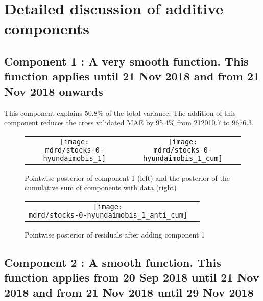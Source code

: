 \documentclass{article} %
\begin{document}
\section{Detailed discussion of additive components}
\label{sec:discussion}

\subsection{Component 1 : A very smooth function. This function applies until 21 Nov 2018 and from 21 Nov 2018 onwards}



This component explains 50.8\% of the total variance.
The addition of this component reduces the cross validated MAE by 95.4\% from 212010.7 to 9676.3.


\begin{figure}[H]
\newcommand{\wmgd}{0.5\columnwidth}
\newcommand{\hmgd}{3.0cm}
\newcommand{\mdrd}{stocks-0-hyundaimobis}
\newcommand{\mbm}{\hspace{-0.3cm}}
\begin{tabular}{cc}
\mbm \texttt{[image: \\mdrd/stocks-0-hyundaimobis\_1]} & \texttt{[image: \\mdrd/stocks-0-hyundaimobis\_1\_cum]}
\end{tabular}
\caption{Pointwise posterior of component 1 (left) and the posterior of the cumulative sum of components with data (right)}
\label{fig:comp1}
\end{figure}

\begin{figure}[H]
\newcommand{\wmgd}{0.5\columnwidth}
\newcommand{\hmgd}{3.0cm}
\newcommand{\mdrd}{stocks-0-hyundaimobis}
\newcommand{\mbm}{\hspace{-0.3cm}}
\begin{tabular}{cc}
\mbm \texttt{[image: \\mdrd/stocks-0-hyundaimobis\_1\_anti\_cum]}
\end{tabular}
\caption{Pointwise posterior of residuals after adding component 1}
\label{fig:comp1}
\end{figure}

\subsection{Component 2 : A smooth function. This function applies from 20 Sep 2018 until 21 Nov 2018 and from 21 Nov 2018 until 29 Nov 2018}
\end{document}

